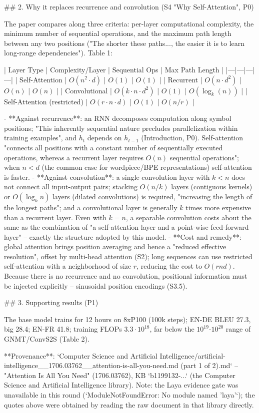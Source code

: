 \documentclass[10pt]{article}
\begin{document}
\begin{AnswerText}
## 2. Why it replaces recurrence and convolution (S4 "Why Self-Attention", P0)

The paper compares along three criteria: per-layer computational complexity, the minimum number of sequential operations, and the maximum path length between any two positions ("The shorter these paths..., the easier it is to learn long-range dependencies"). Table 1:

| Layer Type | Complexity/Layer | Sequential Ops | Max Path Length |
|---|---|---|---|
| Self-Attention | $O(n^2\cdot d)$ | $O(1)$ | $O(1)$ |
| Recurrent | $O(n\cdot d^2)$ | $O(n)$ | $O(n)$ |
| Convolutional | $O(k\cdot n\cdot d^2)$ | $O(1)$ | $O(\log_k(n))$ |
| Self-Attention (restricted) | $O(r\cdot n\cdot d)$ | $O(1)$ | $O(n/r)$ |

- **Against recurrence**: an RNN decomposes computation along symbol positions; "This inherently sequential nature precludes parallelization within training examples", and $h_t$ depends on $h_{t-1}$ (Introduction, P0). Self-attention "connects all positions with a constant number of sequentially executed operations, whereas a recurrent layer requires $O(n)$ sequential operations"; when $n<d$ (the common case for wordpiece/BPE representations) self-attention is faster.
- **Against convolution**: a single convolution layer with $k<n$ does not connect all input-output pairs; stacking $O(n/k)$ layers (contiguous kernels) or $O(\log_k n)$ layers (dilated convolutions) is required, "increasing the length of the longest paths"; and a convolutional layer is generally $k$ times more expensive than a recurrent layer. Even with $k=n$, a separable convolution costs about the same as the combination of "a self-attention layer and a point-wise feed-forward layer" -- exactly the structure adopted by this model.
- **Cost and remedy**: global attention brings position averaging and hence a "reduced effective resolution", offset by multi-head attention (S2); long sequences can use restricted self-attention with a neighborhood of size $r$, reducing the cost to $O(rnd)$. Because there is no recurrence and no convolution, positional information must be injected explicitly -- sinusoidal position encodings (S3.5).

## 3. Supporting results (P1)

The base model trains for 12 hours on 8xP100 (100k steps); EN-DE BLEU 27.3, big 28.4; EN-FR 41.8; training FLOPs $3.3\cdot10^{18}$, far below the $10^{19}$-$10^{20}$ range of GNMT/ConvS2S (Table 2).

**Provenance**: `Computer Science and Artificial Intelligence/artificial-intelligence__1706.03762__attention-is-all-you-need.md (part 1 of 2).md` -- "Attention Is All You Need" (1706.03762), KB `b1199132-...` (the Computer Science and Artificial Intelligence library). Note: the Laya evidence gate was unavailable in this round (`ModuleNotFoundError: No module named 'laya'`); the quotes above were obtained by reading the raw document in that library directly.
\end{AnswerText}
\end{document}
